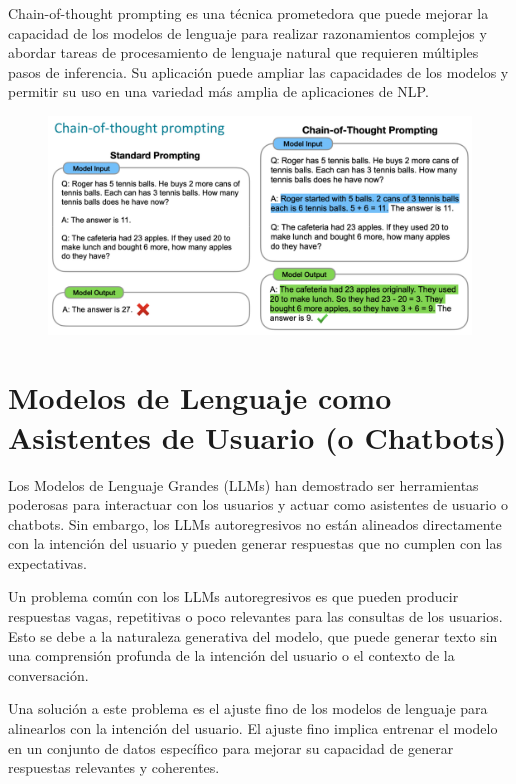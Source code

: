 Chain-of-thought prompting es una técnica prometedora que puede mejorar la capacidad de los modelos de lenguaje para realizar razonamientos complejos y abordar tareas de procesamiento de lenguaje natural que requieren múltiples pasos de inferencia. Su aplicación puede ampliar las capacidades de los modelos y permitir su uso en una variedad más amplia de aplicaciones de NLP.

 \begin{figure}[h]
        	\includegraphics[scale = 0.3]{pics/chainoftought.png}
        \end{figure}



\section{Modelos de Lenguaje como Asistentes de Usuario (o Chatbots)}
Los Modelos de Lenguaje Grandes (LLMs) han demostrado ser herramientas poderosas para interactuar con los usuarios y actuar como asistentes de usuario o chatbots. Sin embargo, los LLMs autoregresivos no están alineados directamente con la intención del usuario y pueden generar respuestas que no cumplen con las expectativas.

Un problema común con los LLMs autoregresivos es que pueden producir respuestas vagas, repetitivas o poco relevantes para las consultas de los usuarios. Esto se debe a la naturaleza generativa del modelo, que puede generar texto sin una comprensión profunda de la intención del usuario o el contexto de la conversación.

Una solución a este problema es el ajuste fino de los modelos de lenguaje para alinearlos con la intención del usuario. El ajuste fino implica entrenar el modelo en un conjunto de datos específico para mejorar su capacidad de generar respuestas relevantes y coherentes.

